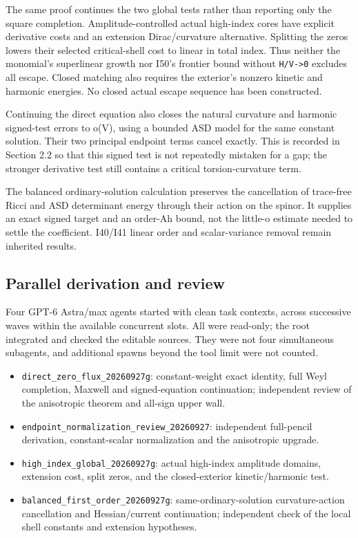\documentclass[
  10pt,
]{article}
\providecommand{\tightlist}{%
  \setlength{\itemsep}{0pt}\setlength{\parskip}{0pt}}
\begin{document}
The same proof continues the two global tests rather than reporting only
the square completion. Amplitude-controlled actual high-index cores have
explicit derivative costs and an extension Dirac/curvature alternative.
Splitting the zeros lowers their selected critical-shell cost to linear
in total index. Thus neither the monomial's superlinear growth nor I50's
frontier bound without \texttt{H/V-\textgreater{}0} excludes all escape.
Closed matching also requires the exterior's nonzero kinetic and
harmonic energies. No closed actual escape sequence has been
constructed.

Continuing the direct equation also closes the natural curvature and
harmonic signed-test errors to o(V), using a bounded ASD model for the
same constant solution. Their two principal endpoint terms cancel
exactly. This is recorded in Section 2.2 so that this signed test is not
repeatedly mistaken for a gap; the stronger derivative test still
contains a critical torsion-curvature term.

The balanced ordinary-solution calculation preserves the cancellation of
trace-free Ricci and ASD determinant energy through their action on the
spinor. It supplies an exact signed target and an order-Ah bound, not
the little-o estimate needed to settle the coefficient. I40/I41 linear
order and scalar-variance removal remain inherited results.

\hypertarget{parallel-derivation-and-review}{%
\subsection{Parallel derivation and
review}\label{parallel-derivation-and-review}}

Four GPT-6 Astra/max agents started with clean task contexts, across
successive waves within the available concurrent slots. All were
read-only; the root integrated and checked the editable sources. They
were not four simultaneous subagents, and additional spawns beyond the
tool limit were not counted.

\begin{itemize}
\tightlist
\item
  \nolinkurl{direct_zero_flux_20260927g}: constant-weight exact
  identity, full Weyl completion, Maxwell and signed-equation
  continuation; independent review of the anisotropic theorem and
  all-sign upper wall.
\item
  \nolinkurl{endpoint_normalization_review_20260927}: independent
  full-pencil derivation, constant-scalar normalization and the
  anisotropic upgrade.
\item
  \nolinkurl{high_index_global_20260927g}: actual high-index amplitude
  domains, extension cost, split zeros, and the closed-exterior
  kinetic/harmonic test.
\item
  \nolinkurl{balanced_first_order_20260927g}: same-ordinary-solution
  curvature-action cancellation and Hessian/current continuation;
  independent check of the local shell constants and extension
  hypotheses.
\end{itemize}
\end{document}
